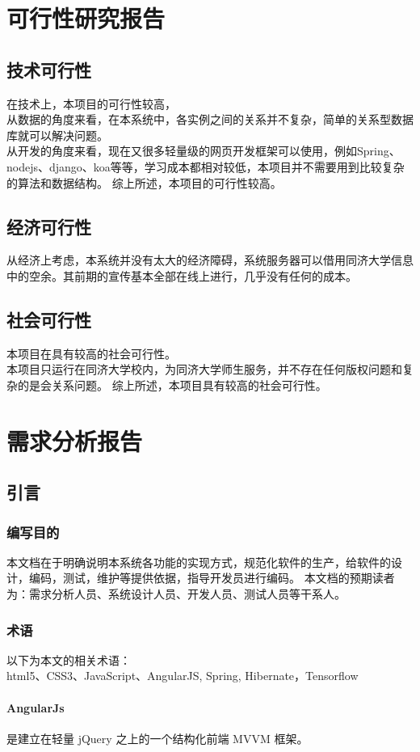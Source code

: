 \documentclass[UTF8]{ctexart}
\begin{document}
\section{可行性研究报告}
\subsection{技术可行性}
在技术上，本项目的可行性较高，\\
从数据的角度来看，在本系统中，各实例之间的关系并不复杂，简单的关系型数据库就可以解决问题。\\
从开发的角度来看，现在又很多轻量级的网页开发框架可以使用，例如Spring、nodejs、django、koa等等，学习成本都相对较低，本项目并不需要用到比较复杂的算法和数据结构。
综上所述，本项目的可行性较高。
\subsection{经济可行性}
从经济上考虑，本系统并没有太大的经济障碍，系统服务器可以借用同济大学信息中的空余。其前期的宣传基本全部在线上进行，几乎没有任何的成本。
\subsection{社会可行性}
本项目在具有较高的社会可行性。\\
本项目只运行在同济大学校内，为同济大学师生服务，并不存在任何版权问题和复杂的是会关系问题。
综上所述，本项目具有较高的社会可行性。
\section{需求分析报告}
\subsection{引言}
\subsubsection{编写目的}
本文档在于明确说明本系统各功能的实现方式，规范化软件的生产，给软件的设计，编码，测试，维护等提供依据，指导开发员进行编码。
本文档的预期读者为：需求分析人员、系统设计人员、开发人员、测试人员等干系人。
\subsubsection{术语}
以下为本文的相关术语：\\
html5、CSS3、JavaScript、AngularJS, Spring, Hibernate，Tensorflow
\paragraph{AngularJs}
是建立在轻量 jQuery 之上的一个结构化前端 MVVM 框架。
\end{document}
